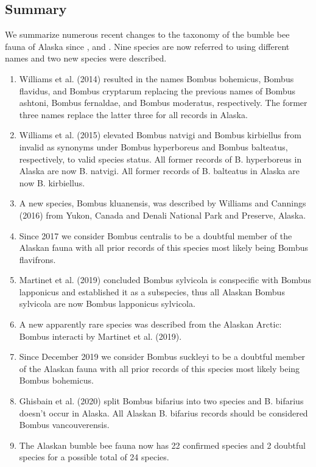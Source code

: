 \vspace{-1cm}
\begin{center}
 \parbox[t][][s]{14cm}{\section{Summary}
 We summarize numerous recent changes to the taxonomy of the bumble bee fauna of Alaska since \citet{Pampell2010, Pampell2013}, \citet{Kochetal2012} and \citet{Pampelletal2012, Pampelletal2015}. Nine species are now referred to using different names and two new species were described.

 \begin{enumerate}
\item Williams et al. (2014) resulted in the names Bombus bohemicus, Bombus flavidus, and Bombus cryptarum replacing the previous names of Bombus ashtoni, Bombus fernaldae, and Bombus moderatus, respectively. The former three names replace the latter three for all records in Alaska.

\item Williams et al. (2015) elevated Bombus natvigi and Bombus kirbiellus from invalid as synonyms under Bombus hyperboreus and Bombus balteatus, respectively, to valid species status. All former records of B. hyperboreus in Alaska are now B. natvigi. All former records of B. balteatus in Alaska are now B. kirbiellus.

\item A new species, Bombus kluanensis, was described by Williams and Cannings (2016) from Yukon, Canada and Denali National Park and Preserve, Alaska.

\item Since 2017 we consider Bombus centralis to be a doubtful member of the Alaskan fauna with all prior records of this species most likely being Bombus flavifrons. 

\item Martinet et al. (2019) concluded Bombus sylvicola is conspecific with Bombus lapponicus and established it as a subspecies, thus all Alaskan Bombus sylvicola are now Bombus lapponicus sylvicola.

\item A new apparently rare species was described from the Alaskan Arctic: Bombus interacti by Martinet et al. (2019).

\item Since December 2019 we consider Bombus suckleyi to be a doubtful member of the Alaskan fauna with all prior records of this species most likely being Bombus bohemicus. 

\item Ghisbain et al. (2020) split Bombus bifarius into two species and B. bifarius doesn't occur in Alaska. All Alaskan B. bifarius records should be considered Bombus vancouverensis.

\item The Alaskan bumble bee fauna now has 22 confirmed species and 2 doubtful species for a possible total of 24 species.

\end{enumerate}
 }
\end{center}

